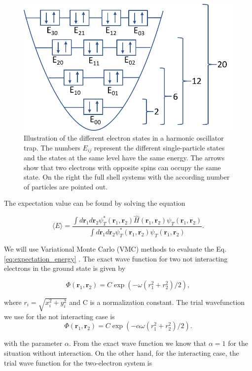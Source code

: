 \begin{figure}[H]
\center
\includegraphics[width=0.6\linewidth]{../Results/states}\caption{Illustration of the different electron states in a harmonic oscillator trap. The numbers $E_{ij}$ represent the different single-particle states and the states at the same level have the same energy. The arrows show that two electrons with opposite spins can occupy the same state. On the right the full shell systems with the according number of particles are pointed out.}\label{fig:states}
\end{figure}

The expectation value can be found by solving the equation

\begin{equation}\label{eq:expectation_energy}
   \langle E \rangle =
   \frac{\int d\bm{r}_1d\bm{r}_2\psi^{\ast}_T(\bm{r}_1,\bm{r}_2)\hat{H}(\bm{r}_1,\bm{r}_2)\psi_T(\bm{r}_1,\bm{r}_2)}
        {\int d\bm{r}_1d\bm{r}_2\psi^{\ast}_T(\bm{r}_1,\bm{r}_2)\psi_T(\bm{r}_1,\bm{r}_2)}.
\end{equation}

We will use Variational Monte Carlo (VMC) methods to evaluate the Eq. \ref{eq:expectation_energy} \cite{project1}. The exact wave function for two not interacting electrons in the ground state is given by

\begin{equation*}
\Phi(\bm{r}_1,\bm{r}_2) = C\exp{\left(-\omega(r_1^2+r_2^2)/2\right)},
\end{equation*}

where $r_i = \sqrt{x_i^2+y_i^2}$ and C is a normalization constant. The trial wavefunction we use for the not interacting case is 
\begin{equation}\label{eq:trial_wf_not_interacing}
\Phi(\bm{r}_1,\bm{r}_2) = C\exp{\left(-\alpha\omega(r_1^2+r_2^2)/2\right)}.
\end{equation}

with the parameter $\alpha$. From the exact wave function we know that $\alpha = 1$ for the situation without interaction. On the other hand, for the interacting case, the trial wave function for the two-electron system is

